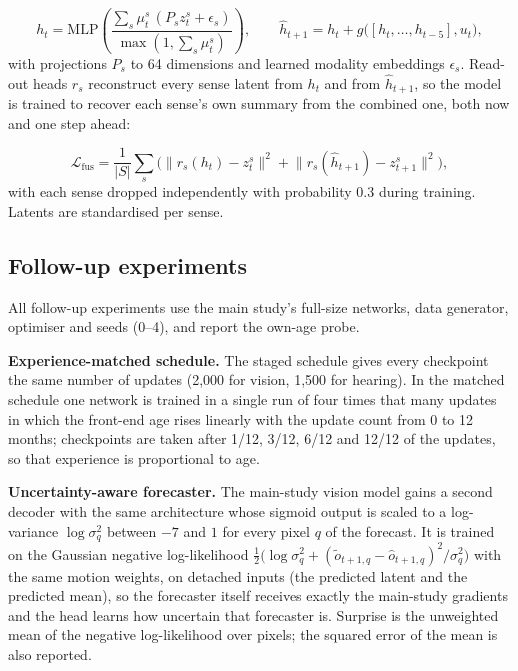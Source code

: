 \documentclass{article}
\begin{document}
\begin{equation}h_t=\mathrm{MLP}\!\left(\frac{\sum_s \mu^s_t\,(P_s z^s_t+\epsilon_s)}{\max(1,\sum_s \mu^s_t)}\right),\qquad \hat h_{t+1}=h_t+g\big([h_t,\dots,h_{t-5}],u_t\big),\end{equation}
with projections \(P_s\) to 64 dimensions and learned modality embeddings \(\epsilon_s\). Read-out heads \(r_s\) reconstruct every sense latent from \(h_t\) and from \(\hat h_{t+1}\), so the model is trained to recover each sense's own summary from the combined one, both now and one step ahead:

\begin{equation}\mathcal L_{\text{fus}}=\frac1{|S|}\sum_s\Big(\lVert r_s(h_t)-z^s_t\rVert^2+\lVert r_s(\hat h_{t+1})-z^s_{t+1}\rVert^2\Big),\end{equation}
with each sense dropped independently with probability 0.3 during training. Latents are standardised per sense.

\hypertarget{follow-up-experiments}{%
\subsection{Follow-up experiments}\label{follow-up-experiments}}

All follow-up experiments use the main study's full-size networks, data generator, optimiser and seeds (0--4), and report the own-age probe.

\textbf{Experience-matched schedule.} The staged schedule gives every checkpoint the same number of updates (2,000 for vision, 1,500 for hearing). In the matched schedule one network is trained in a single run of four times that many updates in which the front-end age rises linearly with the update count from 0 to 12 months; checkpoints are taken after 1/12, 3/12, 6/12 and 12/12 of the updates, so that experience is proportional to age.

\textbf{Uncertainty-aware forecaster.} The main-study vision model gains a second decoder with the same architecture whose sigmoid output is scaled to a log-variance \(\log\sigma^2_q\) between \(-7\) and \(1\) for every pixel \(q\) of the forecast. It is trained on the Gaussian negative log-likelihood \(\tfrac12\big(\log\sigma^2_q+(\tilde o_{t+1,q}-\hat o_{t+1,q})^2/\sigma^2_q\big)\) with the same motion weights, on detached inputs (the predicted latent and the predicted mean), so the forecaster itself receives exactly the main-study gradients and the head learns how uncertain that forecaster is. Surprise is the unweighted mean of the negative log-likelihood over pixels; the squared error of the mean is also reported.
\end{document}

